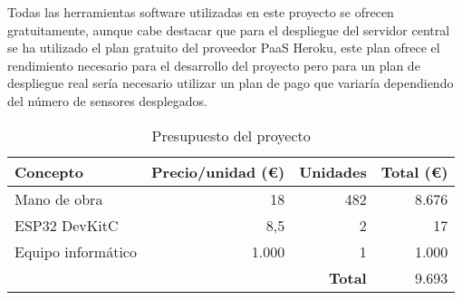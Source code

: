 \documentclass[../proyecto.tex]{subfiles}
\begin{document}
Todas las herramientas software utilizadas en este proyecto se ofrecen gratuitamente, aunque cabe destacar que para el despliegue del servidor central se ha utilizado el plan gratuito del proveedor PaaS Heroku, este plan ofrece el rendimiento necesario para el desarrollo del proyecto pero para un plan de despliegue real sería necesario utilizar un plan de pago que variaría dependiendo del número de sensores desplegados.\\

\begin{table}[H]
\centering
\begin{tabular}{ |l|r|r|r| }
\hline
\textbf{Concepto} & \textbf{Precio/unidad (€)} & \textbf{Unidades} & \textbf{Total (€)}\\
\hline\hline
Mano de obra  & 18  &  482  & 8.676   \\ \hline
ESP32 DevKitC  & 8,5  & 2 & 17\\ \hline
Equipo informático & 1.000 & 1 & 1.000 \\ \hline
 &  & \textbf{Total} & 9.693\\ \hline
\end{tabular}
\caption{Presupuesto del proyecto}
\label{table:presupuesto_proyecto}
\end{table}
\end{document}
